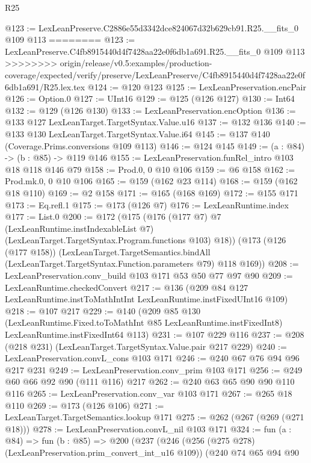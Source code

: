 \begin{lexlean}{R25}
\begin{coremodule}
{{{{{@123 := LexLeanPreserve.C2886e55d3342dce824067d32b629cb91.R25.__fits_0 @109 @113
========
@123 := LexLeanPreserve.C4fb8915440d4f7428aa22e0f6db1a691.R25.__fits_0 @109 @113
>>>>>>>> origin/release/v0.5:examples/production-coverage/expected/verify/preserve/LexLeanPreserve/C4fb8915440d4f7428aa22e0f6db1a691/R25.lex.tex
@124 := @120 @123
@125 := LexLeanPreservation.encPair
@126 := Option.{0}
@127 := UInt16
@129 := @125 (@126 @127)
@130 := Int64
@132 := @129 (@126 @130)
@133 := LexLeanPreservation.encOption
@136 := @133 @127 LexLeanTarget.TargetSyntax.Value.u16
@137 := @132 @136
@140 := @133 @130 LexLeanTarget.TargetSyntax.Value.i64
@145 := @137 @140 (Coverage.Prims.conversions @109 @113)
@146 := @124 @145
@149 := (a : @84) -> (b : @85) -> @119 @146
@155 := LexLeanPreservation.funRel_intro @103 @18 @118 @146 @79
@158 := Prod.{0, 0} @10 @106
@159 := @6 @158
@162 := Prod.mk.{0, 0} @10 @106
@165 := @159 (@162 @23 @114)
@168 := @159 (@162 @18 @110)
@169 := @2 @158
@171 := @165 (@168 @169)
@172 := @155 @171
@173 := Eq.refl.{1}
@175 := @173 (@126 @7)
@176 := LexLeanRuntime.index
@177 := List.{0}
@200 := @172
    (@175
      (@176
        (@177 @7)
        @7
        (LexLeanRuntime.instIndexableList @7)
        (LexLeanTarget.TargetSyntax.Program.functions @103)
        @18))
    (@173
      (@126 (@177 @158))
      (LexLeanTarget.TargetSemantics.bindAll
        (LexLeanTarget.TargetSyntax.Function.parameters @79)
        @118
        @169))
@208 := LexLeanPreservation.conv_build @103 @171 @53 @50 @77 @97 @90
@209 := LexLeanRuntime.checkedConvert
@217 := @136 (@209 @84 @127 LexLeanRuntime.instToMathIntInt LexLeanRuntime.instFixedUInt16 @109)
@218 := @107 @217
@229 := @140
    (@209
      @85
      @130
      (LexLeanRuntime.Fixed.toToMathInt @85 LexLeanRuntime.instFixedInt8)
      LexLeanRuntime.instFixedInt64
      @113)
@231 := @107 @229 @116
@237 := @208 (@218 @231) (LexLeanTarget.TargetSyntax.Value.pair @217 @229)
@240 := LexLeanPreservation.convL_cons @103 @171
@246 := @240 @67 @76 @94 @96 @217 @231
@249 := LexLeanPreservation.conv_prim @103 @171
@256 := @249 @60 @66 @92 @90 (@111 @116) @217
@262 := @240 @63 @65 @90 @90 @110 @116
@265 := LexLeanPreservation.conv_var @103 @171
@267 := @265 @18 @110
@269 := @173 (@126 @106)
@271 := LexLeanTarget.TargetSemantics.lookup @171
@275 := @262 (@267 (@269 (@271 @18)))
@278 := LexLeanPreservation.convL_nil @103 @171
@324 := fun (a : @84) =>
  fun (b : @85) =>
  @200
    (@237
      (@246
        (@256 (@275 @278) (LexLeanPreservation.prim_convert_int_u16 @109))
        (@240
          @74
          @65
          @94
          @90
}}}}}
\end{coremodule}
\end{lexlean}
